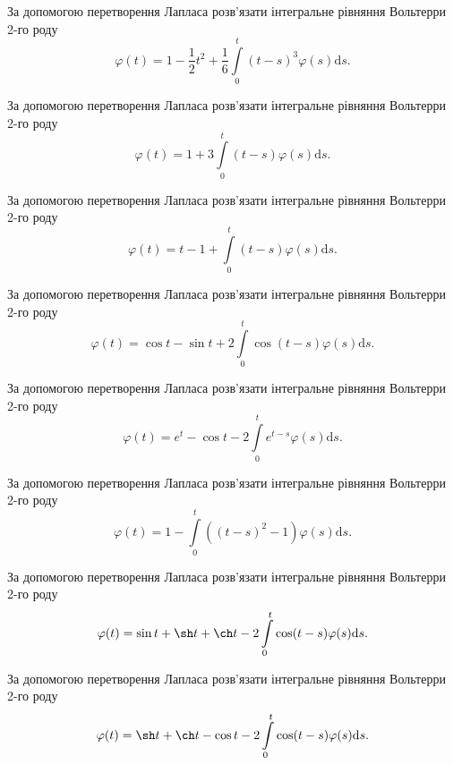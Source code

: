 \documentclass[12pt]{extarticle}
\begin{document}
\begin{Exercise}
За допомогою перетворення Лапласа розв’язати інтегральне рівняння Вольтерри 2-го роду \[\varphi(t) =  1- \dfrac{1}{2} t^2 + \dfrac{1}{6} \int\limits_{0}^{t} (t - s)^3 \varphi(s) \mathrm{d}s.\]
\end{Exercise}

\begin{Exercise}
За допомогою перетворення Лапласа розв’язати інтегральне рівняння Вольтерри 2-го роду \[\varphi(t) = 1 + 3 \int\limits_{0}^{t} (t - s) \varphi(s) \mathrm{d}s.\]
\end{Exercise}

\begin{Exercise}
За допомогою перетворення Лапласа розв’язати інтегральне рівняння Вольтерри 2-го роду \[\varphi(t) = t - 1 + \int\limits_{0}^{t} (t - s) \varphi(s) \mathrm{d}s.\]
\end{Exercise}

\begin{Exercise}
За допомогою перетворення Лапласа розв’язати інтегральне рівняння Вольтерри 2-го роду \[\varphi(t) = \cos t - \sin t + 2 \int\limits_{0}^{t} \cos (t - s) \varphi(s) \mathrm{d}s.\]
\end{Exercise}

\begin{Exercise}
За допомогою перетворення Лапласа розв’язати інтегральне рівняння Вольтерри 2-го роду \[\varphi(t) = e^t - \cos t - 2\int\limits_{0}^{t} e^{t-s} \varphi(s) \mathrm{d}s.\]
\end{Exercise}

\begin{Exercise}
За допомогою перетворення Лапласа розв’язати інтегральне рівняння Вольтерри 2-го роду \[\varphi(t) = 1 - \int\limits_{0}^{t} \left((t-s)^2 - 1\right) \varphi(s) \mathrm{d}s.\]
\end{Exercise}

\begin{Exercise}
За допомогою перетворення Лапласа розв’язати інтегральне рівняння Вольтерри 2-го роду \[\varphi(t) = \sin t + \sh t + \ch t - 2\int\limits_{0}^{t} \cos (t-s) \varphi(s) \mathrm{d}s.\]
\end{Exercise}

\begin{Exercise}
За допомогою перетворення Лапласа розв’язати інтегральне рівняння Вольтерри 2-го роду \[\varphi(t) = \sh t + \ch t - \cos t - 2\int\limits_{0}^{t} \cos (t-s) \varphi(s) \mathrm{d}s.\]
\end{Exercise}
\end{document}
